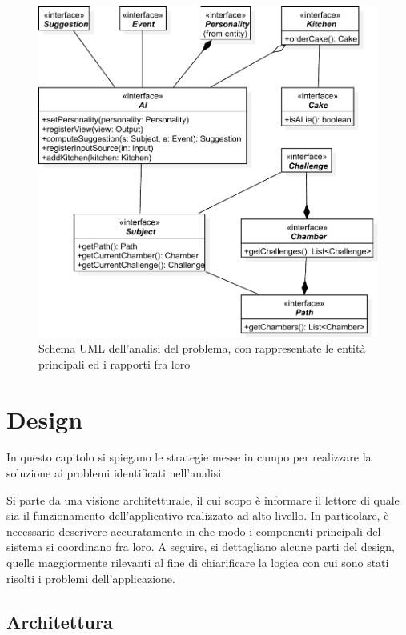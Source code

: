 \documentclass[a4paper,12pt]{report}
\begin{document}
\begin{figure}[h]
\centering{}
\includegraphics{img/analysis}
\caption{Schema UML dell'analisi del problema, con rappresentate le entità principali ed i rapporti fra loro}
\label{img:analysis}
\end{figure}

\chapter{Design}

In questo capitolo si spiegano le strategie messe in campo per realizzare la soluzione ai problemi identificati nell'analisi.

Si parte da una visione architetturale, il cui scopo è informare il lettore di quale sia il funzionamento dell'applicativo realizzato ad alto livello.
%
In particolare, è necessario descrivere accuratamente in che modo i componenti principali del sistema si coordinano fra loro.
%
A seguire, si dettagliano alcune parti del design, quelle maggiormente rilevanti al fine di chiarificare la logica con cui sono stati risolti i problemi dell'applicazione.

\section{Architettura}
\end{document}
